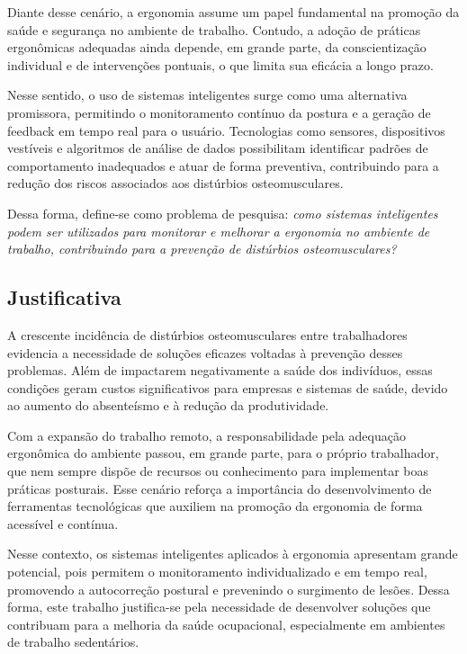 Diante desse cenário, a ergonomia assume um papel fundamental na promoção da saúde
e segurança no ambiente de trabalho. Contudo, a adoção de práticas ergonômicas
adequadas ainda depende, em grande parte, da conscientização individual e de
intervenções pontuais, o que limita sua eficácia a longo prazo.

Nesse sentido, o uso de sistemas inteligentes surge como uma alternativa
promissora, permitindo o monitoramento contínuo da postura e a geração de feedback
em tempo real para o usuário. Tecnologias como sensores, dispositivos vestíveis e
algoritmos de análise de dados possibilitam identificar padrões de comportamento
inadequados e atuar de forma preventiva, contribuindo para a redução dos riscos
associados aos distúrbios osteomusculares.

Dessa forma, define-se como problema de pesquisa: \emph{como sistemas inteligentes
podem ser utilizados para monitorar e melhorar a ergonomia no ambiente de trabalho,
contribuindo para a prevenção de distúrbios osteomusculares?}

\subsection{Justificativa}

A crescente incidência de distúrbios osteomusculares entre trabalhadores evidencia
a necessidade de soluções eficazes voltadas à prevenção desses problemas. Além de
impactarem negativamente a saúde dos indivíduos, essas condições geram custos
significativos para empresas e sistemas de saúde, devido ao aumento do absenteísmo
e à redução da produtividade.

Com a expansão do trabalho remoto, a responsabilidade pela adequação ergonômica do
ambiente passou, em grande parte, para o próprio trabalhador, que nem sempre dispõe
de recursos ou conhecimento para implementar boas práticas posturais. Esse cenário
reforça a importância do desenvolvimento de ferramentas tecnológicas que auxiliem na
promoção da ergonomia de forma acessível e contínua.

Nesse contexto, os sistemas inteligentes aplicados à ergonomia apresentam grande
potencial, pois permitem o monitoramento individualizado e em tempo real,
promovendo a autocorreção postural e prevenindo o surgimento de lesões. Dessa forma,
este trabalho justifica-se pela necessidade de desenvolver soluções que contribuam
para a melhoria da saúde ocupacional, especialmente em ambientes de trabalho
sedentários.

